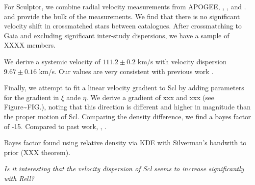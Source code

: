 For Sculptor, we combine radial velocity measurements from APOGEE,
\citet{sestito+2023a}, \citet{tolstoy+2023}, and \citet{WMO2009}.
\citet{tolstoy+2023} and \citet{WMO2009} provide the bulk of the
measurements. We find that there is no significant velocity shift in
crossmatched stars between catalogues. After crossmatching to Gaia and
excluding significant inter-study dispersions, we have a sample of XXXX
members.

We derive a systemic velocity of \(111.2\pm0.2\) km/s with velocity
dispersion \(9.67\pm0.16\) km/s. Our values are very consistent with
previous work \citep[e.g.][\citet{arroyo-polonio+2024},
\citet{tolstoy+2023}]{WMO2009}.

Finally, we attempt to fit a linear velocity gradient to Scl by adding
parameters for the gradient in \(\xi\) ande \(\eta\). We derive a
gradient of xxx and xxx (see Figure\textasciitilde FIG.), noting that
this direction is different and higher in magnitude than the proper
motion of Scl. Comparing the density difference, we find a bayes factor
of -15. Compared to past work, \citet{battaglia+2008},
\citet{arroyo-polonio+2021}.

Bayes factor found using relative density via KDE with Silverman's
bandwith to prior (XXX theorem).

\emph{Is it interesting that the velocity dispersion of Scl seems to
increase significantly with Rell?}


